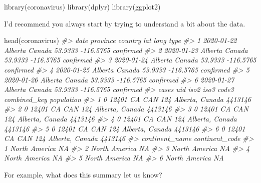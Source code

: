 \documentclass[
]{book}
\newenvironment{Shaded}{\begin{snugshade}}{\end{snugshade}}
\newcommand{\CommentTok}[1]{\textcolor[rgb]{0.56,0.35,0.01}{\textit{#1}}}
\newcommand{\FunctionTok}[1]{\textcolor[rgb]{0.00,0.00,0.00}{#1}}
\newcommand{\NormalTok}[1]{#1}
\begin{document}
\begin{Shaded}
\begin{Highlighting}[]
\FunctionTok{library}\NormalTok{(coronavirus)}
\FunctionTok{library}\NormalTok{(dplyr)}
\FunctionTok{library}\NormalTok{(ggplot2)}
\end{Highlighting}
\end{Shaded}

I'd recommend you always start by trying to understand a bit about the data.

\begin{Shaded}
\begin{Highlighting}[]
\FunctionTok{head}\NormalTok{(coronavirus)}
\CommentTok{\#\textgreater{}         date province country     lat      long      type}
\CommentTok{\#\textgreater{} 1 2020{-}01{-}22  Alberta  Canada 53.9333 {-}116.5765 confirmed}
\CommentTok{\#\textgreater{} 2 2020{-}01{-}23  Alberta  Canada 53.9333 {-}116.5765 confirmed}
\CommentTok{\#\textgreater{} 3 2020{-}01{-}24  Alberta  Canada 53.9333 {-}116.5765 confirmed}
\CommentTok{\#\textgreater{} 4 2020{-}01{-}25  Alberta  Canada 53.9333 {-}116.5765 confirmed}
\CommentTok{\#\textgreater{} 5 2020{-}01{-}26  Alberta  Canada 53.9333 {-}116.5765 confirmed}
\CommentTok{\#\textgreater{} 6 2020{-}01{-}27  Alberta  Canada 53.9333 {-}116.5765 confirmed}
\CommentTok{\#\textgreater{}   cases   uid iso2 iso3 code3    combined\_key population}
\CommentTok{\#\textgreater{} 1     0 12401   CA  CAN   124 Alberta, Canada    4413146}
\CommentTok{\#\textgreater{} 2     0 12401   CA  CAN   124 Alberta, Canada    4413146}
\CommentTok{\#\textgreater{} 3     0 12401   CA  CAN   124 Alberta, Canada    4413146}
\CommentTok{\#\textgreater{} 4     0 12401   CA  CAN   124 Alberta, Canada    4413146}
\CommentTok{\#\textgreater{} 5     0 12401   CA  CAN   124 Alberta, Canada    4413146}
\CommentTok{\#\textgreater{} 6     0 12401   CA  CAN   124 Alberta, Canada    4413146}
\CommentTok{\#\textgreater{}   continent\_name continent\_code}
\CommentTok{\#\textgreater{} 1  North America             NA}
\CommentTok{\#\textgreater{} 2  North America             NA}
\CommentTok{\#\textgreater{} 3  North America             NA}
\CommentTok{\#\textgreater{} 4  North America             NA}
\CommentTok{\#\textgreater{} 5  North America             NA}
\CommentTok{\#\textgreater{} 6  North America             NA}
\end{Highlighting}
\end{Shaded}

For example, what does this summary let us know?
\end{document}

